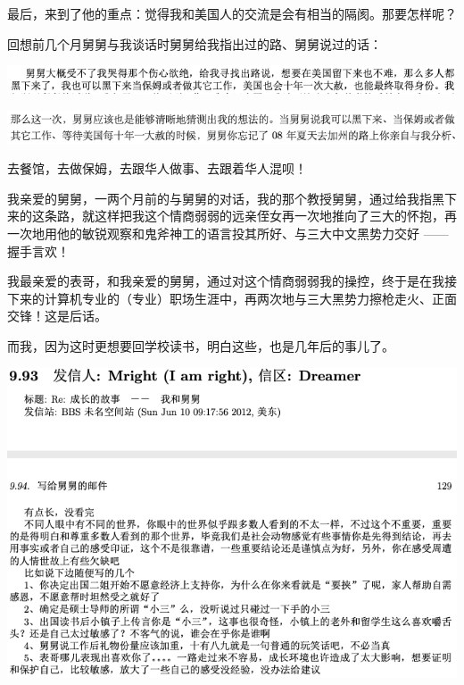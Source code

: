 \documentclass[9pt, b5paper]{article}
\begin{document}
最后，来到了他的重点：觉得我和美国人的交流是会有相当的隔阂。那要怎样呢？

回想前几个月舅舅与我谈话时舅舅给我指出过的路、舅舅说过的话：

\begin{center}
\includegraphics[width=.9\linewidth]{./pic/backups_plans_20210417_230519.png}
\end{center}

\begin{center}
\includegraphics[width=.9\linewidth]{./pic/backups_plans_20210417_230421.png}
\end{center}

去餐馆，去做保姆，去跟华人做事、去跟着华人混呗！

我亲爱的舅舅，一两个月前的与舅舅的对话，我的那个教授舅舅，通过给我指黑下来的这条路，就这样把我这个情商弱弱的远亲侄女再一次地推向了三大的怀抱，再一次地用他的敏锐观察和鬼斧神工的语言投其所好、与三大中文黑势力交好 —— 握手言欢！

我最亲爱的表哥，和我亲爱的舅舅，通过对这个情商弱弱我的操控，终于是在我接下来的计算机专业的（专业）职场生涯中，再两次地与三大黑势力擦枪走火、正面交锋！这是后话。 

而我，因为这时更想要回学校读书，明白这些，也是几年后的事儿了。 

\begin{center}
\includegraphics[width=.9\linewidth]{./pic/p1p129-2.png}
\end{center}
\end{document}
